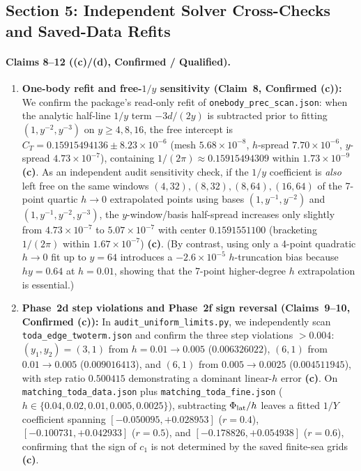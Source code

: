 \documentclass[11pt,a4paper]{article}
\newcommand{\C}{\textbf{(c)}}
\newcommand{\D}{\textbf{(d)}}
\newcommand{\scr}[1]{\texttt{#1}}
\begin{document}
\subsection{Section 5: Independent Solver Cross-Checks and Saved-Data Refits}
\paragraph{Claims 8--12 (\C/\D, Confirmed / Qualified).}
\begin{enumerate}
\item \textbf{One-body refit and free-$1/y$ sensitivity (Claim~8, Confirmed \C):}
We confirm the package's read-only refit of \scr{onebody\_prec\_scan.json}:
when the analytic half-line $1/y$ term $-3d/(2y)$ is subtracted prior to fitting
$(1,y^{-2},y^{-3})$ on $y\ge 4,8,16$, the free intercept is
$C_T=0.15915494136\pm 8.23\times 10^{-6}$ (mesh $5.68\times 10^{-8}$, $h$-spread
$7.70\times 10^{-6}$, $y$-spread $4.73\times 10^{-7}$), containing
$1/(2\pi)\approx 0.15915494309$ within $1.73\times 10^{-9}$ \C.
As an independent audit sensitivity check, if the $1/y$ coefficient is
\emph{also} left free on the same windows $(4,32),(8,32),(8,64),(16,64)$ of the
7-point quartic $h\to 0$ extrapolated points using bases $(1,y^{-1},y^{-2})$ and
$(1,y^{-1},y^{-2},y^{-3})$, the $y$-window/basis half-spread increases only
slightly from $4.73\times 10^{-7}$ to $5.07\times 10^{-7}$ with center
$0.1591551100$ (bracketing $1/(2\pi)$ within $1.67\times 10^{-7}$) \C.
(By contrast, using only a 4-point quadratic $h\to 0$ fit up to $y=64$ introduces
a $-2.6\times 10^{-5}$ $h$-truncation bias because $hy=0.64$ at $h=0.01$,
showing that the 7-point higher-degree $h$ extrapolation is essential.)

\item \textbf{Phase~2d step violations and Phase~2f sign reversal (Claims~9--10, Confirmed \C):}
In \scr{audit\_uniform\_limits.py}, we independently scan
\scr{toda\_edge\_twoterm.json} and confirm the three step violations $>0.004$:
$(y_1,y_2)=(3,1)$ from $h=0.01\to 0.005$ ($0.006326022$), $(6,1)$ from
$0.01\to 0.005$ ($0.009016413$), and $(6,1)$ from $0.005\to 0.0025$
($0.004511945$), with step ratio $0.500415$ demonstrating a dominant linear-$h$
error \C. On \scr{matching\_toda\_data.json} plus \scr{matching\_toda\_fine.json}
($h\in\{0.04,0.02,0.01,0.005,0.0025\}$), subtracting $\Phi_{\rm lat}/h$ leaves a
fitted $1/Y$ coefficient spanning $[-0.050095,+0.028953]$ ($r=0.4$),
$[-0.100731,+0.042933]$ ($r=0.5$), and $[-0.178826,+0.054938]$ ($r=0.6$),
confirming that the sign of $c_1$ is not determined by the saved finite-sea
grids \C.


\end{enumerate}
\end{document}
